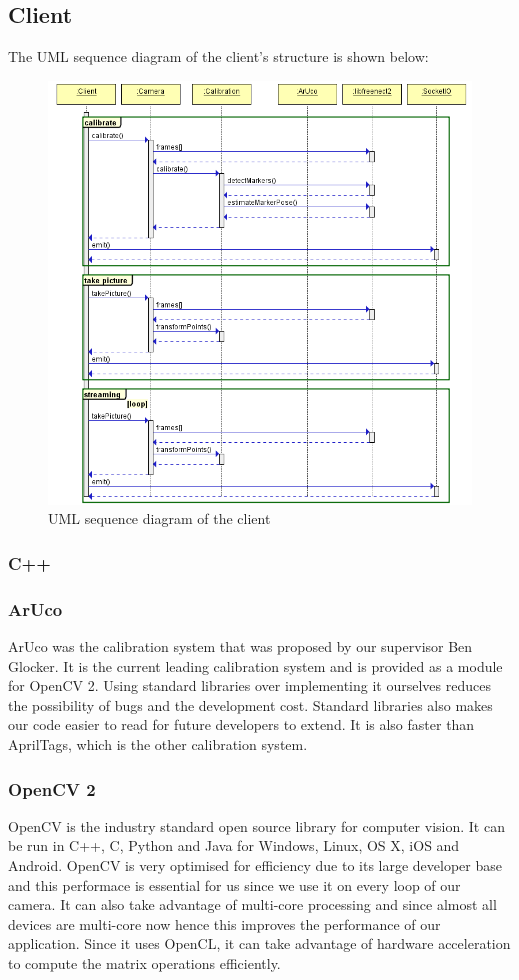 \documentclass{article}
\begin{document}
\subsection{Client}
The UML sequence diagram of the client's structure is shown below:
\begin{figure}[h]
  \centering
  \includegraphics[scale=0.6]{clientUML}
  \caption{UML sequence diagram of the client}
\end{figure}
\subsubsection{C++}
\subsubsection{ArUco}
ArUco was the calibration system that was proposed by our supervisor Ben Glocker. It is the current leading calibration system and is provided as a module for OpenCV 2. Using standard libraries over implementing it ourselves reduces the possibility of bugs and the development cost. Standard libraries also makes our code easier to read for future developers to extend. It is also faster than AprilTags, which is the other calibration system.
\subsubsection{OpenCV 2}
OpenCV is the industry standard open source library for computer vision. It can be run in C++, C, Python and Java for Windows, Linux, OS X, iOS and Android. OpenCV is very optimised for efficiency due to its large developer base and this performace is essential for us since we use it on every loop of our camera. It can also take advantage of multi-core processing and since almost all devices are multi-core now hence this improves the performance of our application. Since it uses OpenCL, it can take advantage of hardware acceleration to compute the matrix operations efficiently.
\end{document}
